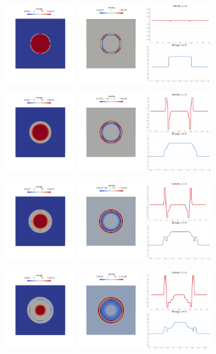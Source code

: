\begin{figure}[H]
		\begin{center}
			\includegraphics[width=0.82\textwidth]{img/limit/l1.jpg}
		\end{center}
	\end{figure}\vspace{-12mm}
	\begin{figure}[H]
		\begin{center}
			\includegraphics[width=0.82\textwidth]{img/limit/l2.jpg}
		\end{center}
	\end{figure}\vspace{-12mm}
	\begin{figure}[H]
		\begin{center}
			\includegraphics[width=0.82\textwidth]{img/limit/l3.jpg}
		\end{center}
	\end{figure}\vspace{-12mm}
	\begin{figure}[H]
		\begin{center}
			\includegraphics[width=0.82\textwidth]{img/limit/l4.jpg}
		\end{center}
	\end{figure}\vspace{-12mm}

